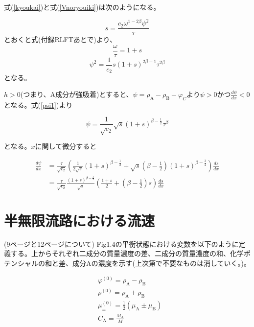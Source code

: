 \documentclass[a4paper,12pt, oneside, openany]{jsbook}
\begin{document}
式(\ref{kyoukai})と式(\ref{Vnoryouiki})は次のようになる。


\begin{equation}
  s=\frac{c_2\omega^{1-2\beta}\psi^2}{\tau}
\end{equation}
とおくと式(付録RLFTあとで)より、
\begin{equation}
  \frac{\omega}{\tau}=1+s
\end{equation}
\begin{equation}\label{psi1}
  \psi^2=\frac{1}{c_2}s(1+s)^{2\beta-1}\tau^{2\beta}
\end{equation}
となる。

$h>0$(つまり、A成分が強吸着)とすると、$\psi=\rho_\mathrm{A}-\rho_\mathrm{B}-\varphi_C$より$\psi>0$かつ$\frac{d\psi}{dx}<0$となる。式(\ref{psi1})より

\begin{equation}
  \psi=\frac{1}{\sqrt{c_2}}\sqrt{s}(1+s)^{\beta-\frac{1}{2}}\tau^\beta
\end{equation}

となる。$x$に関して微分すると

\begin{equation}
\begin{split}
   \frac{d\psi}{dx}&=\frac{\tau}{\sqrt{c_2}}\left(\frac{1}{2\sqrt{s}}(1+s)^{\beta-\frac{1}{2}}+\sqrt{s}(\beta-\frac{1}{2})(1+s)^{\beta-\frac{3}{2}}\right)\frac{ds}{dx}\\
   &=\frac{\tau}{\sqrt{c_2}}\frac{(1+s)^{\beta-\frac{3}{2}}}{\sqrt{s}}\left(\frac{1+s}{2}+\left(\beta-\frac{1}{2}\right)s\right)\frac{ds}{dx}
\end{split}
\end{equation}






\section{半無限流路における流速}
(9ページと12ページについて)
Fig1.4の平衡状態における変数を以下のように定義する。上からそれぞれ二成分の質量濃度の差、二成分の質量濃度の和、化学ポテンシャルの和と差、成分Aの濃度を示す(上次第で不要なものは消していく。)。

\begin{equation}
  \begin{split}
    &\varphi^{(0)}=\rho_\mathrm{A}-\rho_\mathrm{B}\\
    &\rho^{(0)}=\rho_\mathrm{A}+\rho_\mathrm{B}\\
    &\mu_{\pm}^{(0)}=\frac{1}{2}(\mu_\mathrm{A}\pm\mu_\mathrm{B})\\
    &C_\mathrm{A}=\frac{M_\mathrm{A}}{M}
  \end{split}
\end{equation}
\end{document}
